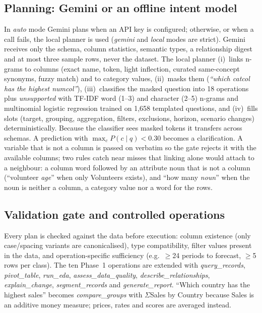 \documentclass[conference]{IEEEtran}
\begin{document}
\subsection{Planning: Gemini or an offline intent model}
In \emph{auto} mode Gemini plans when an API key is configured; otherwise, or when a call fails, the local planner is used (\emph{gemini} and \emph{local} modes are strict). Gemini receives only the schema, column statistics, semantic types, a relationship digest and at most three sample rows, never the dataset. The local planner (i)~links n-grams to columns (exact name, token, light inflection, curated same-concept synonyms, fuzzy match) and to category values, (ii)~masks them (\textit{``which catcol has the highest numcol''}), (iii)~classifies the masked question into 18 operations plus \emph{unsupported} with TF-IDF word (1--3) and character (2--5) n-grams and multinomial logistic regression trained on 1,658 templated questions, and (iv)~fills slots (target, grouping, aggregation, filters, exclusions, horizon, scenario changes) deterministically. Because the classifier sees masked tokens it transfers across schemas. A prediction with $\max_c P(c\mid q)<0.30$ becomes a clarification. A variable that is not a column is passed on verbatim so the gate rejects it with the available columns; two rules catch near misses that linking alone would attach to a neighbour: a column word followed by an attribute noun that is not a column (``volunteer \emph{age}'' when only Volunteers exists), and ``how many \emph{noun}'' when the noun is neither a column, a category value nor a word for the rows.

\subsection{Validation gate and controlled operations}
Every plan is checked against the data before execution: column existence (only case/spacing variants are canonicalised), type compatibility, filter values present in the data, and operation-specific sufficiency (e.g.\ $\geq$24 periods to forecast, $\geq$5 rows per class). The ten Phase~1 operations are extended with \emph{query\_records}, \emph{pivot\_table}, \emph{run\_eda}, \emph{assess\_data\_quality}, \emph{describe\_relationships}, \emph{explain\_change}, \emph{segment\_records} and \emph{generate\_report}. ``Which country has the highest sales'' becomes \emph{compare\_groups} with $\Sigma$Sales by Country because Sales is an additive money measure; prices, rates and scores are averaged instead.
\end{document}
